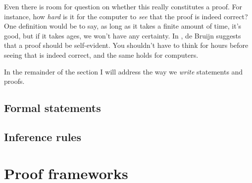 Even there is room for question on whether this really constitutes a proof.
For instance, how \emph{hard} is it for the computer to \emph{see} that the
proof is indeed correct? One definition would be to say, as long as it takes
a finite amount of time, it's good, but if it takes ages, we won't have any
certainty. In , de Bruijn suggests that a proof should be
self-evident. You shouldn't have to think for hours before seeing that is indeed
correct, and the same holds for computers.

In the remainder of the section I will address the way we \emph{write}
statements and proofs.

\subsection{Formal statements}

\subsection{Inference rules}

\section{Proof frameworks}